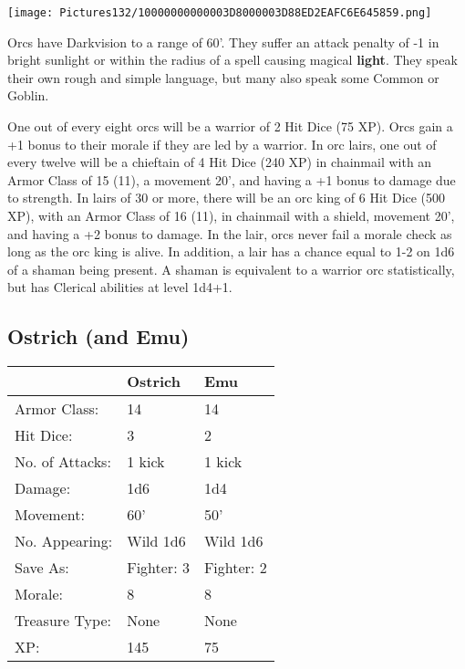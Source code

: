 \documentclass[a4paper,twoside,openany,10pt]{book}
\begin{document}
\begin{multicols}{2}
\begin{center} \texttt{[image: Pictures132/10000000000003D8000003D88ED2EAFC6E645859.png]} \end{center}


Orcs have Darkvision to a range of 60'. They suffer an attack penalty of -1 in bright sunlight or within the radius of a spell causing magical \textbf{light}. They speak their own rough and simple language, but many also speak some Common or Goblin.

One out of every eight orcs will be a warrior of 2 Hit Dice (75 XP). Orcs gain a +1 bonus to their morale if they are led by a warrior. In orc lairs, one out of every twelve will be a chieftain of 4 Hit Dice (240 XP) in chainmail with an Armor Class of 15 (11), a movement 20', and having a +1 bonus to damage due to strength. In lairs of 30 or more, there will be an orc king of 6 Hit Dice (500 XP), with an Armor Class of 16 (11), in chainmail with a shield, movement 20', and having a +2 bonus to damage. In the lair, orcs never fail a morale check as long as the orc king is alive. In addition, a lair has a chance equal to 1-2 on 1d6 of a shaman being present. A shaman is equivalent to a warrior orc statistically, but has Clerical abilities at level 1d4+1.


\subsection*{Ostrich (and Emu)}\label{ostrich-and-emu}

\begin{tabularx}{0.50\textwidth}{@{}llX@{}}
& Ostrich & Emu \\\hline
Armor Class: & 14 & 14 \\\hline
Hit Dice: & 3 & 2 \\\hline
No. of Attacks: & 1 kick & 1 kick \\\hline
Damage: & 1d6 & 1d4 \\\hline
Movement: & 60' & 50' \\\hline
No. Appearing: & Wild 1d6 & Wild 1d6 \\\hline
Save As: & Fighter: 3 & Fighter: 2 \\\hline
Morale: & 8 & 8 \\\hline
Treasure Type: & None & None \\\hline
XP: & 145 & 75 \\\hline
\end{tabularx}\medskip


\end{multicols}
\end{document}
